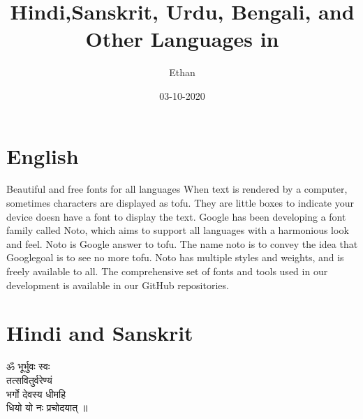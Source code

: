 \documentclass[12pt]{article}
\title{Hindi,Sanskrit, Urdu, Bengali, and Other Languages in }
\author{Ethan}
\date{03-10-2020}
\begin{document}
\maketitle
\vskip-1cm
\hrulefill

\section{English}
Beautiful and free fonts for all languages
When text is rendered by a computer, sometimes characters are displayed as tofu. They are little boxes to indicate your device doesn have a font to display the text.
Google has been developing a font family called Noto, which aims to support all languages with a harmonious look and feel. Noto is Google answer to tofu. The name noto is to convey the idea that Googlegoal is to see no more tofu. Noto has multiple styles and weights, and is freely available to all. The comprehensive set of fonts and tools used in our development is available in our GitHub repositories.

\section{Hindi and  Sanskrit}
\begin{hindi}
ॐ भूर्भुवः स्वः\\
तत्सवितुर्वरेण्यं\\
भर्गो देवस्य धीमहि\\
धियो यो नः प्रचोदयात् ॥\\
\end{hindi}
\end{document}
